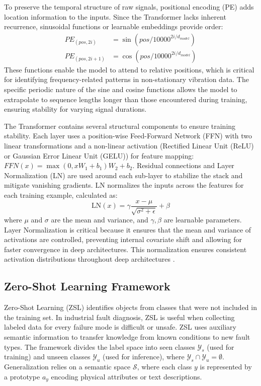 \documentclass[journal]{IEEEtran}
\begin{document}
To preserve the temporal structure of raw signals, positional encoding (PE) adds location information to the inputs. Since the Transformer lacks inherent recurrence, sinusoidal functions or learnable embeddings provide order:
\begin{equation}
\begin{aligned}
PE_{(pos, 2i)} &= \sin(pos / 10000^{2i/d_{model}}) \\
PE_{(pos, 2i+1)} &= \cos(pos / 10000^{2i/d_{model}})
\end{aligned}
\end{equation}
These functions enable the model to attend to relative positions, which is critical for identifying frequency-related patterns in non-stationary vibration data. The specific periodic nature of the sine and cosine functions allows the model to extrapolate to sequence lengths longer than those encountered during training, ensuring stability for varying signal durations.

The Transformer contains several structural components to ensure training stability. Each layer uses a position-wise Feed-Forward Network (FFN) with two linear transformations and a non-linear activation (Rectified Linear Unit (ReLU) or Gaussian Error Linear Unit (GELU)) for feature mapping: $FFN(x) = \max(0, xW_1 + b_1)W_2 + b_2$. Residual connections and Layer Normalization (LN) are used around each sub-layer to stabilize the stack and mitigate vanishing gradients. LN normalizes the inputs across the features for each training example, calculated as:
\begin{equation}
\text{LN}(x) = \gamma \frac{x - \mu}{\sqrt{\sigma^2 + \epsilon}} + \beta
\end{equation}
where $\mu$ and $\sigma$ are the mean and variance, and $\gamma, \beta$ are learnable parameters. Layer Normalization is critical because it ensures that the mean and variance of activations are controlled, preventing internal covariate shift and allowing for faster convergence in deep architectures. This normalization ensures consistent activation distributions throughout deep architectures \cite{vaswani2017attention}.

\subsection{Zero-Shot Learning Framework}
Zero-Shot Learning (ZSL) identifies objects from classes that were not included in the training set. In industrial fault diagnosis, ZSL is useful when collecting labeled data for every failure mode is difficult or unsafe. ZSL uses auxiliary semantic information to transfer knowledge from known conditions to new fault types. The framework divides the label space into seen classes $\mathcal{Y}_s$ (used for training) and unseen classes $\mathcal{Y}_u$ (used for inference), where $\mathcal{Y}_s \cap \mathcal{Y}_u = \emptyset$. Generalization relies on a semantic space $\mathcal{S}$, where each class $y$ is represented by a prototype $a_y$ encoding physical attributes or text descriptions.
\end{document}
